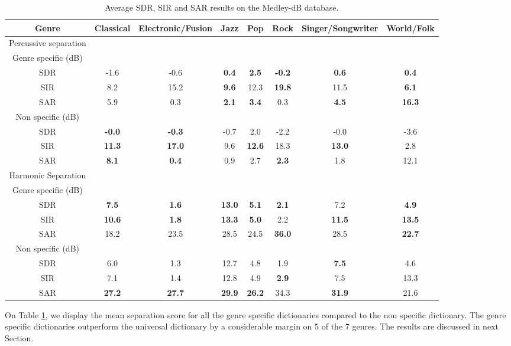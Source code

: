 \documentclass{article}
\begin{document}
\begin{table}
   
\begin{tabular}{|c|c|c|c|c|c|c|c|}
\hline   
Genre & Classical & Electronic/Fusion & Jazz & Pop & Rock & Singer/Songwriter & World/Folk \\
\hline
Percussive separation & & & & & & & \\
\hline
Genre specific (dB)  & & & & & & & \\
SDR & -1.6     & -0.6     &\bf{0.4} & \bf{2.5}&\bf{-0.2}& \bf{0.6} & \bf{0.4} \\
SIR & 8.2      & 15.2     &\bf{9.6} & 12.3    &\bf{19.8}& 11.5     & \bf{6.1} \\
SAR & 5.9      & 0.3      &\bf{2.1} & \bf{3.4}& 0.3    & \bf{4.5} & \bf{16.3} \\
\hline
Non specific (dB) & & & & & & &\\
SDR & \bf{-0.0}& \bf{-0.3}& -0.7    & 2.0     & -2.2    & -0.0     & -3.6 \\
SIR & \bf{11.3} & \bf{17.0}& 9.6     &\bf{12.6}& 18.3    & \bf{13.0}& 2.8 \\
SAR & \bf{8.1} & \bf{0.4} & 0.9     & 2.7     &\bf{2.3} & 1.8      & 12.1 \\
\hline   
Harmonic Separation &  & & & & & & \\  
\hline
Genre specific (dB)  & & & & & & & \\
SDR & \bf{7.5}    & \bf{1.6}    & \bf{13.0} & \bf{5.1}  & \bf{2.1}& 7.2      &\bf{4.9} \\
SIR & \bf{10.6}   & \bf{1.8}    & \bf{13.3} & \bf{5.0 } & 2.2     & \bf{11.5}& \bf{13.5} \\
SAR & 18.2       & 23.5       & 28.5      & 24.5      &\bf{36.0}& 28.5     & \bf{22.7} \\
\hline
Non specific (dB) & & & & & & &\\
SDR & 6.0        & 1.3       & 12.7     & 4.8      & 1.9      & \bf{7.5}      & 4.6\\
SIR & 7.1       & 1.4        & 12.8     & 4.9      & \bf{2.9} & 7.5      & 13.3 \\
SAR & \bf{27.2}& \bf{27.7}   & \bf{29.9} & \bf{26.2}& 34.3     &\bf{31.9} & 21.6\\
\hline
  \end{tabular} 
\caption{\label{specresults} Average SDR, SIR and SAR results on the Medley-dB database.}
\end{table}



On Table \ref{specresults}, we display the mean separation score for all the genre specific dictionaries compared to the non specific dictionary. The genre specific dictionaries outperform the universal dictionary by a considerable margin on $5$ of the $7$ genres. The results are discussed in  next Section.
\end{document}
